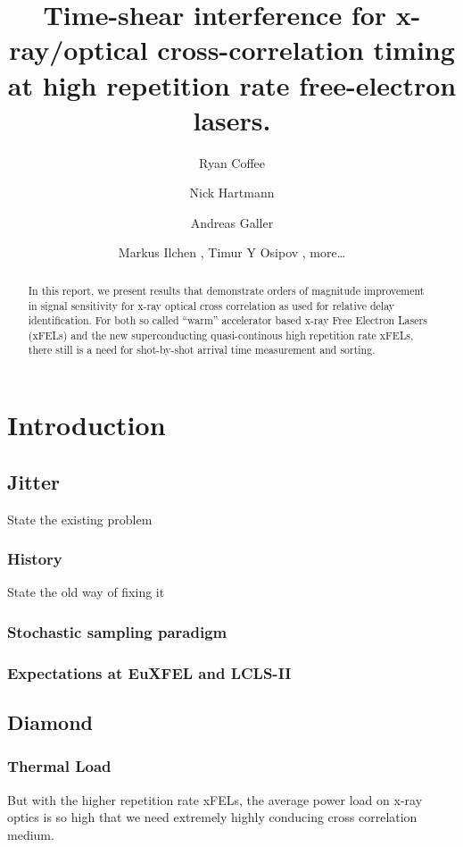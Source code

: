 \documentclass{article}
\begin{document}
\author{Ryan Coffee}
\author{Nick Hartmann}
\author{Andreas Galler}
\author{Markus Ilchen
, Timur Y Osipov
, more\ldots}

\title{Time-shear interference for x-ray/optical cross-correlation timing at high repetition rate free-electron lasers.}

\begin{abstract}
In this report, we present results that demonstrate orders of magnitude improvement in signal sensitivity for x-ray optical cross correlation as used for relative delay identification.
For both so called ``warm'' accelerator based x-ray Free Electron Lasers (xFELs) and the new superconducting quasi-continous high repetition rate xFELs, there still is a need for shot-by-shot arrival time measurement and sorting.
\end{abstract}

\maketitle


\section{Introduction}
\subsection{Jitter}
State the existing problem
\subsubsection{History}
State the old way of fixing it
\subsubsection{Stochastic sampling paradigm}
\subsubsection{Expectations at EuXFEL and LCLS-II}
\subsection{Diamond}
\subsubsection{Thermal Load}
	But with the higher repetition rate xFELs, the average power load on x-ray optics is so high that we need extremely highly conducing cross correlation medium.
\end{document}

